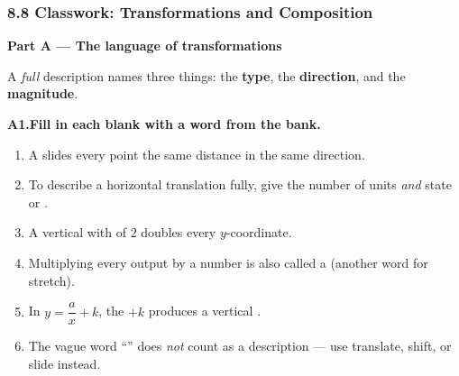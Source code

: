 \documentclass[12pt, twoside]{article}
\begin{document}
\subsubsection*{8.8 Classwork: Transformations and Composition}

\noindent\textbf{\large Part A --- The language of transformations}

\medskip
\noindent A \emph{full} description names three things: the \textbf{type}, the
\textbf{direction}, and the \textbf{magnitude}.

\medskip
\noindent{}

\medskip
\noindent\textbf{A1.\quad Fill in each blank with a word from the bank.}
\begin{enumerate}[itemsep=0.30cm, label=(\alph*)]
  \item A \underline{\hspace{3cm}} slides every point the same distance in the same direction.
  \item To describe a horizontal translation fully, give the number of units \emph{and} state \underline{\hspace{2.3cm}} or \underline{\hspace{2.3cm}}.
  \item A vertical \underline{\hspace{2.8cm}} with \underline{\hspace{2.8cm}} of $2$ doubles every $y$-coordinate.
  \item Multiplying every output by a number is also called a \underline{\hspace{3cm}} (another word for stretch).
  \item In $y = \dfrac{a}{x} + k$, the $+k$ produces a vertical \underline{\hspace{3cm}}.
  \item The vague word ``\underline{\hspace{2.5cm}}'' does \emph{not} count as a description --- use translate, shift, or slide instead.
\end{enumerate}
\end{document}

